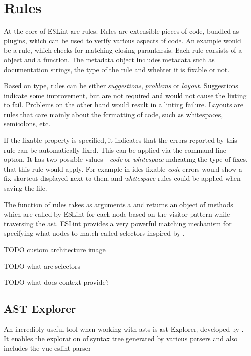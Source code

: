 \section{Rules}
At the core of ESLint are rules. Rules are extensible pieces of code, bundled as plugins, which can be used to verify various aspects of code. An example would be a rule, which checks for matching closing paranthesis. 
Each rule consists of a  object
and a  function. The metadata object includes metadata such as documentation strings, the type of the rule and whehter it is fixable or not.

Based on type, rules can be either \textit{suggestions}, \textit{problems} or \textit{layout}. Suggestions indicate some improvement, but are not required and would not cause the linting to fail. Problems on the other hand would result in a linting failure. Layouts are rules that care mainly about the formatting of code, such as whitespaces, semicolons, etc. 

If the fixable property is specified, it indicates that the errors reported by this rule can be automatically fixed. This can be applied via the  command line option. It has two possible values - \textit{code} or \textit{whitespace} indicating the type of fixes, that this rule would apply. For example in \glspl{ide} fixable \textit{code} errors would show a fix shortcut displayed next to them and \textit{whitespace} rules could be applied when saving the file.

The  function of rules takes as arguments a  and returns an object of methods which are called by ESLint for each node based on the \gls{visitor} pattern while traversing the \gls{ast}. ESLint provides a very powerful matching mechanism for specifying what nodes to match called selectors \parencite{eslintSelectors} inspired by \textcite{estoolsEsQuery}. 


TODO custom architecture image

TODO what are selectors

TODO what does context provide?

\subsection{AST Explorer}
An incredibly useful tool when working with \glspl{ast} is \gls{ast} Explorer, developed by \textcite{astexplorer_fkling2021Jan}. It enables the exploration of syntax tree generated by various parsers and also includes the vue-eslint-parser \parencite{eslint_vue_parser}

